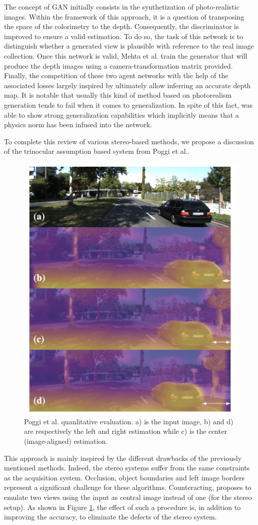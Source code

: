 The concept of GAN initially consists in the synthetization of photo-realistic images. Within the framework of this approach, it is a question of transposing the space of the colorimetry to the depth. Consequently, the discriminator is improved to ensure a valid estimation. To do so, the task of this network is to distinguish whether a generated view is plausible with reference to the real image collection. Once this network is valid, Mehta et al. train the generator that will produce the depth images using a camera-transformation matrix provided. Finally, the competition of these two agent networks with the help of the associated losses largely inspired by \cite{godard2017unsupervised} 
ultimately allow inferring an accurate depth map.
It is notable that usually this kind of method based on photorealism generation tends to fail when it comes to generalization. In spite of this fact, \cite{mehta2018structured} was able to show strong generalization capabilities which implicitly means that a physics norm has been infused into the network.


To complete this review of various stereo-based methods, we propose a discussion of the trinocular assumption based system from Poggi et al.\cite{poggi2018learning}. 

\begin{figure}[h]
	\centering
	\includegraphics[width=0.5\linewidth]{Figures/SOA/illupoggi}
	\caption[Poggi et al. quanlitative evaluation.]{Poggi et al. quanlitative evaluation. a) is the input image, b) and d) are respectively the left and right estimation while c) is the center (image-aligned) estimation.}
	\label{illupoggi}
\end{figure}


This approach is mainly inspired by the different drawbacks of the previously mentioned methods. Indeed, the stereo systems suffer from the same constraints as the acquisition system. Occlusion, object boundaries and left image borders represent a significant challenge for these algorithms. Counteracting, \cite{poggi2018learning} proposes to emulate two views using the input as central image instead of one (for the stereo setup). As shown in Figure \ref{illupoggi}, the effect of such a procedure is, in addition to improving the accuracy, to eliminate the defects of the stereo system.


